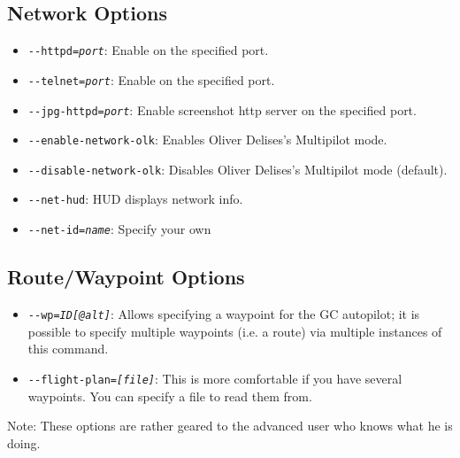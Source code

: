 \subsection{Network Options}
\begin{itemize}
\item{\texttt{-$ $-httpd={\it port}}}: Enable  on the specified port.
\item{\texttt{-$ $-telnet={\it port}}}: Enable  on the specified port.
\item{\texttt{-$ $-jpg-httpd={\it port}}}: Enable screenshot http server on the specified port.
\item{\texttt{-$ $-enable-network-olk}}: Enables Oliver Delises's Multipilot mode.
\item{\texttt{-$ $-disable-network-olk}}: Disables Oliver Delises's Multipilot mode (default).
\item{\texttt{-$ $-net-hud}}: HUD displays network info.
\item{\texttt{-$ $-net-id={\it name}}}: Specify your own 
 \end{itemize}
\subsection{Route/Waypoint Options}
\begin{itemize}
\item{\texttt{-$ $-wp={\it ID[@alt]}}}: Allows specifying a waypoint for the GC autopilot; it
is possible to specify multiple waypoints (i.e. a route) via multiple instances of this
command.
\item{\texttt{-$ $-flight-plan={\it [file]}}}: This is more comfortable if
you have several waypoints. You can  specify a file to read them from.
\end{itemize}

Note: These options are rather geared to the advanced user who knows what he is doing. 

